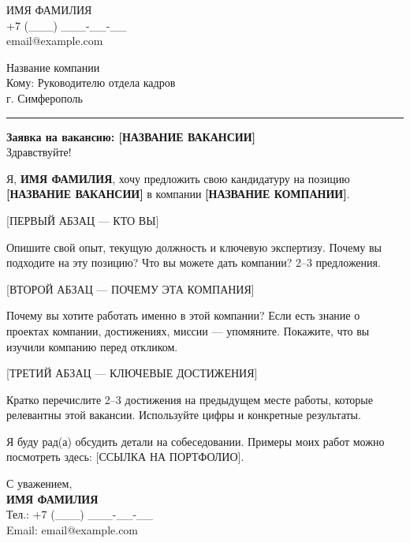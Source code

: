 \documentclass[11pt,a4paper]{article}
\newcommand{\companyinfo}[3]{
  \begin{flushright}
    \small
    #1\\
    #2\\
    #3
  \end{flushright}
  \vspace{1em}
}
\newcommand{\senderinfo}[3]{
  \begin{flushleft}
    \small
    #1\\
    #2\\
    #3
  \end{flushleft}
  \vspace{2em}
}
\newcommand{\lettersubject}[1]{
  \noindent\textbf{\large\color{cvblue} #1}\\[1em]
}
\begin{document}

\senderinfo
  {ИМЯ ФАМИЛИЯ}       %
  {+7 (___) ___-__-__} %
  {email@example.com}  %

\companyinfo
  {Название компании}  %
  {Кому: Руководителю отдела кадров} %
  {г. Симферополь}     %

\vspace{1em}
\hrule
\vspace{1em}

\lettersubject{Заявка на вакансию: [НАЗВАНИЕ ВАКАНСИИ]}

\noindent Здравствуйте!

Я, \textbf{ИМЯ ФАМИЛИЯ}, хочу предложить свою кандидатуру на позицию \textbf{[НАЗВАНИЕ ВАКАНСИИ]} в компании \textbf{[НАЗВАНИЕ КОМПАНИИ]}.

[ПЕРВЫЙ АБЗАЦ — КТО ВЫ]

Опишите свой опыт, текущую должность и ключевую экспертизу. Почему вы подходите на эту позицию? Что вы можете дать компании? 2–3 предложения.

[ВТОРОЙ АБЗАЦ — ПОЧЕМУ ЭТА КОМПАНИЯ]

Почему вы хотите работать именно в этой компании? Если есть знание о проектах компании, достижениях, миссии — упомяните. Покажите, что вы изучили компанию перед откликом.

[ТРЕТИЙ АБЗАЦ — КЛЮЧЕВЫЕ ДОСТИЖЕНИЯ]

Кратко перечислите 2–3 достижения на предыдущем месте работы, которые релевантны этой вакансии. Используйте цифры и конкретные результаты.

\vspace{0.5em}

Я буду рад(а) обсудить детали на собеседовании. Примеры моих работ можно посмотреть здесь: [ССЫЛКА НА ПОРТФОЛИО].

\vspace{1em}
\noindent С уважением,\\
\textbf{ИМЯ ФАМИЛИЯ}\\
\small\color{cvgray} Тел.: +7 (___) ___-__-__\\
\small\color{cvgray} Email: email@example.com
\end{document}

